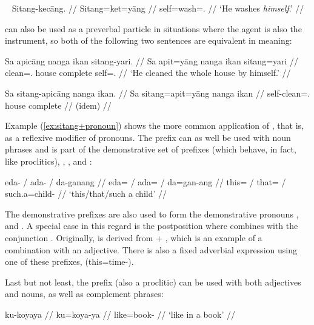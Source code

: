 \ex~\begingl
	\gla Sitang-kecāng. //
	\glb Sitang=ket=yāng //
	\glc self=wash=\TsgM{}.\Aarg{} //
	\glft `He washes \emph{himself}.' //
\endgl\xe

 can also be used as a preverbal particle in situations
where the agent is also the instrument, so both of the following two sentences
are equivalent in meaning:

\pex
\a\label{ex:sitang+pronoun}\begingl
	\gla Sa apicāng nanga ikan sitang-yari. //
	\glb Sa apit=yāng nanga ikan sitang=yari //
	\glc \PatT{} clean=\Tsg{}.\Aarg{} house complete 
		self=\TsgM{}.\Ins{} //
	\glft `He cleaned the whole house by himself.' //
\endgl

\a\begingl
	\gla Sa sitang-apicāng nanga ikan. //
	\glb Sa sitang=apit=yāng nanga ikan //
	\glc \PatT{} self-clean=\Tsg{}.\Aarg{} house complete //
	\glft (idem) //
\endgl
\xe

\label{nounprefixes}
Example (\ref{ex:sitang+pronoun}) shows the more common application of 
, that is, as a reflexive modifier of pronouns. The 
prefix  can as well be used with noun phrases and is part of the 
demonstrative set of prefixes (which behave, in fact, like proclitics), 
, , and :

\ex\begingl
	\gla eda- / ada- / da-ganang //
	\glb eda= / ada= / da=gan-ang //
	\glc this= / that= / such.a=child-\Aarg{} //
	\glft `this/that/such a child' //
\endgl\xe

The demonstrative prefixes are also used to form the demonstrative 
pronouns , 
 and . A special case 
in this regard is the postposition  where  combines with the conjunction 
. Originally, 
 is derived from  + 
, which is an example of a combination 
with an adjective. There is also a fixed adverbial expression using one of 
these prefixes,  
(this=time-\Dat{}).

Last but not least, the prefix  (also a
proclitic) can be used with both adjectives and nouns, as well as
complement phrases:

\pex
\a\begingl
	\gla ku-koyaya //
	\glb ku=koya-ya //
	\glc like=book-\Loc{} //
	\glft `like in a book' //
\endgl

